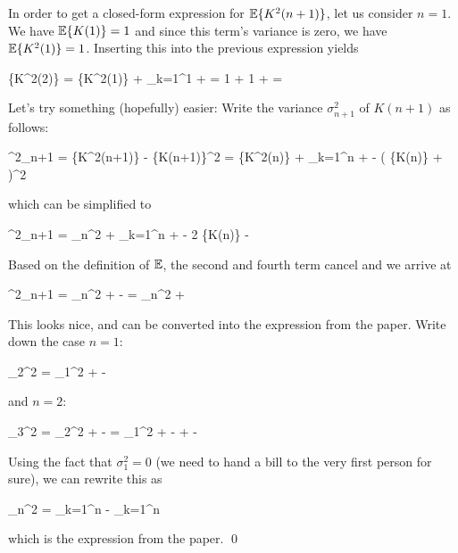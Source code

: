 In order to get a closed-form expression for $\mathbb{E}\{K^2(n+1)\}$, let us consider $n=1$. We have $\mathbb{E}\{K(1)\} = 1$ and since this term's variance is zero, we have $\mathbb{E}\{K^2(1)\} = 1$. Inserting this into the previous expression yields

\bee
\mE\{K^2(2)\} = \mE\{K^2(1)\} +  \sum_{k=1}^1  +  = 1 + 1  +  = 
\eee

Let's try something (hopefully) easier: Write the variance $\sigma^2_{n+1}$ of $K(n+1)$ as follows:

\bee
\sigma^2_{n+1} = \mE\{K^2(n+1)\} - \mE\{K(n+1)\}^2 = \mE\{K^2(n)\} +  \sum_{k=1}^n  +  - \left( \mE\{K(n)\} +  \right)^2
\eee

which can be simplified to

\bee
\sigma^2_{n+1} = \sigma_n^2 +  \sum_{k=1}^n  +  - 2  \mE\{K(n)\} - 
\eee

Based on the definition of $\mathbb{E}$, the second and fourth term cancel and we arrive at

\bee
\sigma^2_{n+1} = \sigma_n^2 +  -  = \sigma_n^2 + 
\eee

This looks nice, and can be converted into the expression from the paper. Write down the case $n=1$:

\bee
\sigma_2^2 = \sigma_1^2 +  - 
\eee

and $n=2$:

\bee
\sigma_3^2 = \sigma_2^2 +  -  = \sigma_1^2  +  -  +  - 
\eee

Using the fact that $\sigma_1^2 = 0$ (we need to hand a bill to the very first person for sure), we can rewrite this as

\bee
\sigma_n^2 = \sum_{k=1}^n  - \sum_{k=1}^n 
\eee

which is the expression from the paper. \qed
